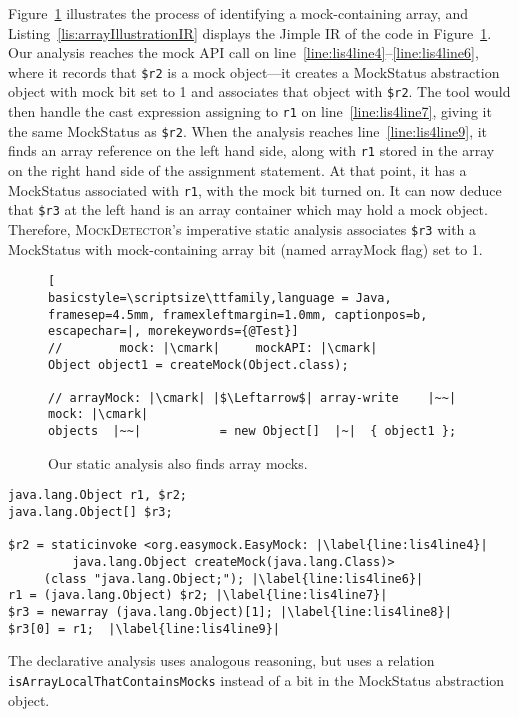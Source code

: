 Figure~\ref{fig:arrayMockIllustration} illustrates the process of identifying a mock-containing array, and Listing~\ref{lis:arrayIllustrationIR} displays the Jimple IR of the code in Figure~\ref{fig:arrayMockIllustration}. Our analysis reaches the mock API call on line~\ref{line:lis4line4}--\ref{line:lis4line6}, where it records that \texttt{\$r2} is a mock object---it creates a MockStatus abstraction object with mock bit set to 1 and associates that object with \texttt{\$r2}. The tool would then handle the cast expression assigning to \texttt{r1} on line~\ref{line:lis4line7}, giving it the same MockStatus as \texttt{\$r2}. When the analysis reaches line~\ref{line:lis4line9}, it finds an array reference on the left hand side, along with \texttt{r1} stored in the array on the right hand side of the assignment statement. At that point, it has a MockStatus associated with \texttt{r1}, with the mock bit turned on. It can now deduce that \texttt{\$r3} at the left hand is an array container which may hold a mock object. Therefore, \textsc{MockDetector}'s imperative static analysis associates \texttt{\$r3} with a MockStatus with mock-containing array bit (named arrayMock flag) set to 1.


\begin{figure}
\begin{lstlisting}[
basicstyle=\scriptsize\ttfamily,language = Java, framesep=4.5mm, framexleftmargin=1.0mm, captionpos=b, escapechar=|, morekeywords={@Test}]
//        mock: |\cmark|     mockAPI: |\cmark|
Object object1 = createMock(Object.class);

// arrayMock: |\cmark| |$\Leftarrow$| array-write    |~~|  mock: |\cmark|
objects  |~~|           = new Object[]  |~|  { object1 };
\end{lstlisting}
    
    \caption{Our static analysis also finds array mocks.}
    \label{fig:arrayMockIllustration}
    
\end{figure}

\begin{lstlisting}[basicstyle=\ttfamily, caption={Jimple Intermediate Representation for the array in Figure~\ref{fig:arrayMockIllustration}.},
basicstyle=\scriptsize\ttfamily, framesep=4.5mm, framexleftmargin=1.0mm, captionpos=b, label=lis:arrayIllustrationIR, escapechar=|, morekeywords={@Test, specialinvoke, virtualinvoke, staticinvoke, newarray}]
java.lang.Object r1, $r2;
java.lang.Object[] $r3;

$r2 = staticinvoke <org.easymock.EasyMock: |\label{line:lis4line4}|
         java.lang.Object createMock(java.lang.Class)>
     (class "java.lang.Object;"); |\label{line:lis4line6}|
r1 = (java.lang.Object) $r2; |\label{line:lis4line7}|
$r3 = newarray (java.lang.Object)[1]; |\label{line:lis4line8}|
$r3[0] = r1;  |\label{line:lis4line9}|
\end{lstlisting}


The declarative analysis uses analogous reasoning, but uses a relation \texttt{isArrayLocalThatContainsMocks} instead of a bit in the MockStatus abstraction object.
